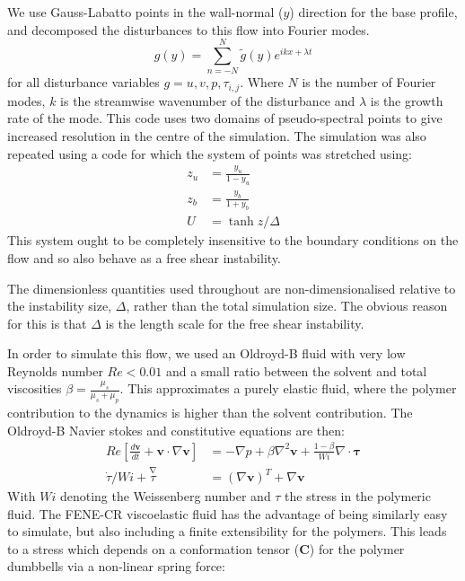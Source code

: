 \documentclass{article}
\newcommand{\dt}[1]{\frac{d #1}{d t}} %
\begin{document}
We use Gauss-Labatto points in the wall-normal ($y$) direction for the base profile, and decomposed the disturbances to this flow into Fourier modes.
\begin{equation}
    g(y) = \sum\limits_{n=-N}^{N} \widetilde{g}(y) e^{ikx + \lambda t}
\end{equation}
for all disturbance variables $g = u, v, p, \tau_{i,j}$. Where $N$ is the number of Fourier modes, $k$ is the streamwise wavenumber of the disturbance and $\lambda$ is the growth rate of the mode. This code uses two domains of pseudo-spectral points to give increased resolution in the centre of the simulation. The simulation was also repeated using a code for which the system of points was stretched using:
\begin{align}
    z_{u} &= \frac{y_{u}}{1-y_{u}} \\
    z_{b} &= \frac{y_{b}}{1+y_{b}} \\
    U     &= \tanh{z/\Delta} 
    \label{eq:KH_inf_profile}
\end{align}
This system ought to be completely insensitive to the boundary conditions on the flow and so also behave as a free shear instability. 

The dimensionless quantities used throughout are non-dimensionalised relative to the instability size, $\Delta$, rather than the total simulation size. The obvious reason for this is that $\Delta$ is the length scale for the free shear instability.

In order to simulate this flow, we used an Oldroyd-B fluid with very low Reynolds number $Re < 0.01$ and a small ratio between the solvent and total viscosities $\beta = \frac{\mu_{s}}{\mu_{s}+\mu_{p}}$. This approximates a purely elastic fluid, where the polymer contribution to the dynamics is higher than the solvent contribution. The Oldroyd-B Navier stokes and constitutive equations are then:
\begin{align}
    Re \left[ \dt{\mathbf{v}} + \mathbf{v} \cdot \nabla  \mathbf{v} \right] &= - \nabla p + \beta \nabla^{2} \mathbf{v} + \frac{1-\beta}{Wi} \nabla \cdot \mathbf{\tau} \\
    \dot{\tau}/Wi + \overset{\nabla}\tau &= \left(\nabla \mathbf{v}\right)^{T} + \nabla{\mathbf{v}}
\end{align}
With $Wi$ denoting the Weissenberg number and $\tau$ the stress in the polymeric fluid. The FENE-CR viscoelastic fluid has the advantage of being similarly easy to simulate, but also including a finite extensibility for the polymers. This leads to a stress which depends on a conformation tensor ($\mathbf{C}$) for the polymer dumbbells via a non-linear spring force:
\end{document}
